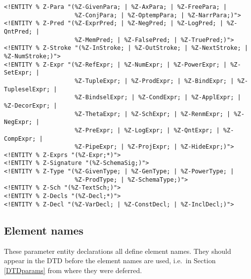 \documentclass[a4paper,10pt]{article}
\begin{document}
\begin{verbatim}
<!ENTITY % Z-Para "(%Z-GivenPara; | %Z-AxPara; | %Z-FreePara; |
                    %Z-ConjPara; | %Z-OptempPara; | %Z-NarrPara;)">
<!ENTITY % Z-Pred "(%Z-ExprPred; | %Z-NegPred; | %Z-LogPred; | %Z-QntPred; |
                    %Z-MemPred; | %Z-FalsePred; | %Z-TruePred;)">
<!ENTITY % Z-Stroke "(%Z-InStroke; | %Z-OutStroke; | %Z-NextStroke; | %Z-NumStroke;)">
<!ENTITY % Z-Expr "(%Z-RefExpr; | %Z-NumExpr; | %Z-PowerExpr; | %Z-SetExpr; |
                    %Z-TupleExpr; | %Z-ProdExpr; | %Z-BindExpr; | %Z-TupleselExpr; |
                    %Z-BindselExpr; | %Z-CondExpr; | %Z-ApplExpr; | %Z-DecorExpr; |
                    %Z-ThetaExpr; | %Z-SchExpr; | %Z-RenmExpr; | %Z-NegExpr; |
                    %Z-PreExpr; | %Z-LogExpr; | %Z-QntExpr; | %Z-CompExpr; |
                    %Z-PipeExpr; | %Z-ProjExpr; | %Z-HideExpr;)">
<!ENTITY % Z-Exprs "(%Z-Expr;*)">
<!ENTITY % Z-Signature "(%Z-SchemaSig;)">
<!ENTITY % Z-Type "(%Z-GivenType; | %Z-GenType; | %Z-PowerType; |
                    %Z-ProdType; | %Z-SchemaType;)">
<!ENTITY % Z-Sch "(%Z-TextSch;)">
<!ENTITY % Z-Decls "(%Z-Decl;*)">
<!ENTITY % Z-Decl "(%Z-VarDecl; | %Z-ConstDecl; | %Z-InclDecl;)">
\end{verbatim}

\subsection{Element names}\label{ElementNames}

These parameter entity declarations all define element names.
They should appear in the DTD before the element names are used,
i.e.\ in Section \ref{DTDparams} from where they were deferred.
\end{document}
